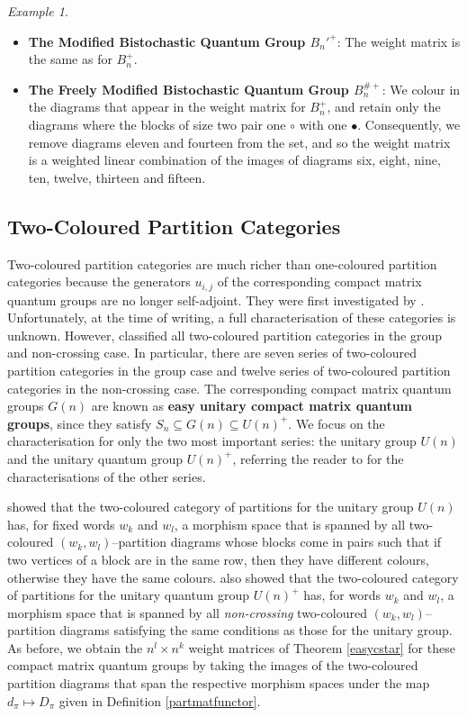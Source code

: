 \documentclass{article}
\theoremstyle{plain}
\theoremstyle{definition}
\theoremstyle{remark}
\newtheorem{example}[theorem]{Example}
\begin{document}
\begin{example}
\begin{itemize}
		The weight matrix is the same as for $S_n^{+}$.
	\item
		\textbf{The Modified Bistochastic Quantum Group $B_n'^{+}$}:
		The weight matrix is the same as for $B_n^{+}$.
	\item
		\textbf{The Freely Modified Bistochastic Quantum Group $B_n^{\#{+}}$}:
		We colour in the diagrams that appear in the weight matrix 
		for $B_n^{+}$, and retain only the diagrams where the blocks 
		of size two pair one $\circ$ with one $\bullet$.
		Consequently, we remove diagrams eleven and fourteen from the set, 
		and so the weight matrix is a weighted linear combination of 
		the images of diagrams six, eight, nine, ten, twelve, 
		thirteen and fifteen.
\end{itemize}
\end{example}

\subsection{Two-Coloured Partition Categories}

Two-coloured partition categories are much richer than one-coloured partition categories 
because the generators $u_{i,j}$ of the corresponding compact matrix quantum groups are 
no longer self-adjoint.
They were first investigated by \citet{freslonweber2016}.
Unfortunately, at the time of writing, a full characterisation of these categories 
is unknown. However, 
\citet{tarrago2016, tarrago2018}
classified all two-coloured partition categories in the group and non-crossing case.
In particular, there are seven series of two-coloured partition categories in the group
case and twelve series of two-coloured partition categories in the non-crossing case.
The corresponding compact matrix quantum groups $G(n)$ are known as 
\textbf{easy unitary compact matrix quantum groups}, since they satisfy 
$S_n \subseteq G(n) \subseteq U(n)^{+}$. 
We focus on the  characterisation for only the two most important series:
the unitary group $U(n)$ and the unitary quantum group $U(n)^+$,
referring the reader to \citet[Theorem 5.3]{tarrago2016}
for the characterisations of the other series. 

\citet{tarrago2016, tarrago2018} showed that the two-coloured category of partitions
for the unitary group $U(n)$ has, for fixed words $w_k$ and $w_l$, a morphism space that
is spanned by all two-coloured $(w_k, w_l)$--partition diagrams 
whose blocks come in pairs such that if two vertices of a block are in the same row, 
then they have different colours, otherwise they have the same colours.
\citet{tarrago2016, tarrago2018} also showed that the two-coloured category of partitions
for the unitary quantum group $U(n)^+$ has, for words $w_k$ and $w_l$, a morphism space that
is spanned by all \textit{non-crossing} two-coloured $(w_k, w_l)$--partition diagrams 
satisfying the same conditions as those for the unitary group.
As before, we obtain the $n^l \times n^k$ weight matrices of 
Theorem \ref{easycstar}
for these compact matrix quantum groups
by taking the images of the two-coloured partition diagrams that span the respective morphism spaces
under the map $d_\pi \mapsto D_\pi$ given in Definition \ref{partmatfunctor}.
\end{document}
